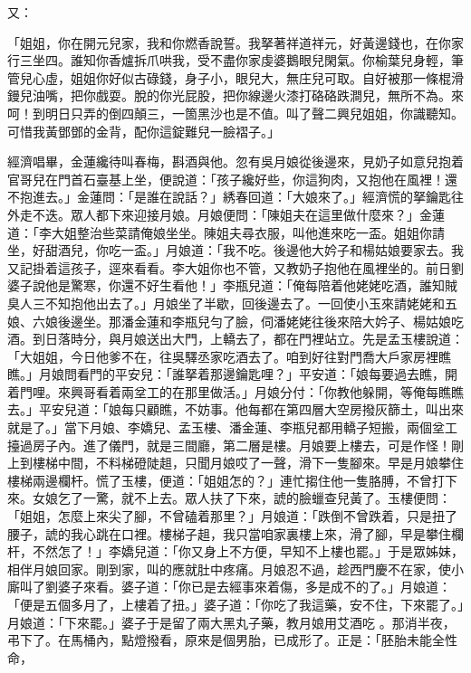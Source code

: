 \begin{showcontents}{}
又：

「姐姐，你在開元兒家，我和你燃香說誓。我拏著祥道祥元，好黃邊錢也，在你家行三坐四。誰知你香爐拆爪哄我，受不盡你家虔婆鵝眼兒閑氣。你榆葉兒身輕，筆管兒心虛，姐姐你好似古碌錢，身子小，眼兒大，無庄兒可取。自好被那一條棍滑鏝兒油嘴，把你戲耍。脫的你光屁股，把你線邊火漆打硌硌跌澗兒，無所不為。來呵！到明日只弄的倒四顛三，一箇黑沙也是不值。叫了聲二興兒姐姐，你識聽知。可惜我黃鄧鄧的金背，配你這錠難兒一臉褶子。」

經濟唱畢，金蓮纔待叫春梅，斟酒與他。忽有吳月娘從後邊來，見奶子如意兒抱着官哥兒在門首石臺基上坐，便說道：「孩子纔好些，你這狗肉，又抱他在風裡！還不抱進去。」金蓮問：「是誰在說話？」綉春回道：「大娘來了。」經濟慌的拏鑰匙往外走不迭。眾人都下來迎接月娘。月娘便問：「陳姐夫在這里做什麼來？」金蓮道：「李大姐整治些菜請俺娘坐坐。陳姐夫尋衣服，叫他進來吃一盃。姐姐你請坐，好甜酒兒，你吃一盃。」月娘道：「我不吃。後邊他大妗子和楊姑娘要家去。我又記掛着這孩子，逕來看看。李大姐你也不管，又教奶子抱他在風裡坐的。前日劉婆子說他是驚寒，你還不好生看他！」李瓶兒道：「俺每陪着他姥姥吃酒，誰知賊臭人三不知抱他出去了。」月娘坐了半歇，回後邊去了。一回使小玉來請姥姥和五娘、六娘後邊坐。那潘金蓮和李瓶兒勻了臉，伺潘姥姥往後來陪大妗子、楊姑娘吃酒。到日落時分，與月娘送出大門，上轎去了，都在門裡站立。先是孟玉樓說道：「大姐姐，今日他爹不在，往吳驛丞家吃酒去了。咱到好往對門喬大戶家房裡瞧瞧。」月娘問看門的平安兒：「誰拏着那邊鑰匙哩？」平安道：「娘每要過去瞧，開着門哩。來興哥看着兩坌工的在那里做活。」月娘分付：「你教他躲開，等俺每瞧瞧去。」平安兒道：「娘每只顧瞧，不妨事。他每都在第四層大空房撥灰篩土，叫出來就是了。」當下月娘、李嬌兒、孟玉樓、潘金蓮、李瓶兒都用轎子短搬，兩個坌工擡過房子內。進了儀門，就是三間廳，第二層是樓。月娘要上樓去，可是作怪！剛上到樓梯中間，不料梯磴陡趄，只聞月娘哎了一聲，滑下一隻腳來。早是月娘攀住樓梯兩邊欄杆。慌了玉樓，便道：「姐姐怎的？」連忙搊住他一隻胳膊，不曾打下來。女娘乞了一驚，就不上去。眾人扶了下來，諕的臉蠟查兒黃了。玉樓便問：「姐姐，怎麼上來尖了腳，不曾磕着那里？」月娘道：「跌倒不曾跌着，只是扭了腰子，諕的我心跳在口裡。樓梯子趄，我只當咱家裏樓上來，滑了腳，早是攀住欄杆，不然怎了！」李嬌兒道：「你又身上不方便，早知不上樓也罷。」于是眾姊妹，相伴月娘回家。剛到家，叫的應就肚中疼痛。月娘忍不過，趁西門慶不在家，使小廝叫了劉婆子來看。婆子道：「你已是去經事來着傷，多是成不的了。」月娘道：「便是五個多月了，上樓着了扭。」婆子道：「你吃了我這藥，安不住，下來罷了。」月娘道：「下來罷。」婆子于是留了兩大黑丸子藥，教月娘用艾酒吃 。那消半夜，弔下了。在馬桶內，點燈撥看，原來是個男胎，已成形了。正是：「胚胎未能全性命，  
\end{showcontents}
